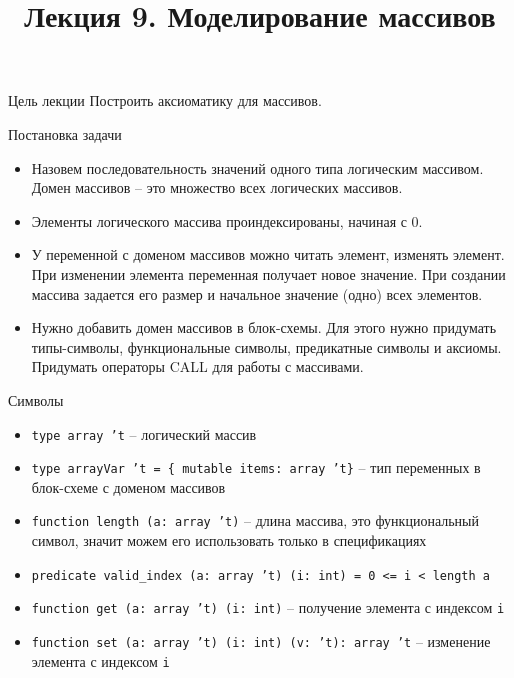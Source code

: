 \documentclass[hyperref={unicode=true}]{beamer}
\title{Лекция 9. Моделирование массивов}
\author{}
\date{}
\begin{document}
	\begin{frame}{}
		\titlepage
	\end{frame}

    \begin{frame}{Цель лекции}
    Построить аксиоматику для массивов.
    \end{frame}

    \begin{frame}{Постановка задачи}
    \begin{itemize}
    \item
    Назовем последовательность значений одного типа
    логическим массивом. Домен массивов -- это множество
    всех логических массивов.
    \item
    Элементы логического массива проиндексированы, начиная с 0.
    \item
    У переменной с доменом массивов можно читать элемент,
    изменять элемент. При изменении элемента переменная получает
    новое значение. При создании массива задается его размер
    и начальное значение (одно) всех элементов.
    \item
    Нужно добавить домен массивов в блок-схемы.
    Для этого нужно придумать типы-символы,
    функциональные символы, предикатные символы и аксиомы.
    Придумать операторы CALL для работы с массивами.
    \end{itemize}
    \end{frame}

    \begin{frame}{Символы}
    \begin{itemize}
    \item \texttt{type array 't} -- логический массив
    \item \texttt{type arrayVar 't = \{ mutable items: array 't\}}
    -- тип переменных в блок-схеме с доменом массивов
    \item \texttt{function length (a: array 't)} -- длина массива,
    это функциональный символ, значит можем его использовать только
    в спецификациях
    \item \texttt{predicate valid\_index (a: array 't) (i: int) =
        0 <= i < length a}
    \item \texttt{function get (a: array 't) (i: int)} -- получение
    элемента с индексом \texttt{i}
    \item \texttt{function set (a: array 't) (i: int) (v: 't): array 't}
    -- изменение элемента с индексом \texttt{i}
    \end{itemize}
    \end{frame}
\end{document}
